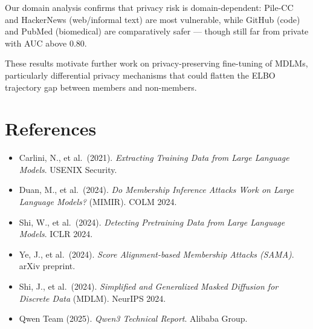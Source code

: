 \documentclass[11pt,a4paper]{article}
\begin{document}
Our domain analysis confirms that privacy risk is domain-dependent:
Pile-CC and HackerNews (web/informal text) are most vulnerable, while GitHub
(code) and PubMed (biomedical) are comparatively safer --- though still far
from private with AUC above 0.80.

These results motivate further work on privacy-preserving fine-tuning of MDLMs,
particularly differential privacy mechanisms that could flatten the ELBO trajectory
gap between members and non-members.

\section*{References}

\begin{itemize}[nosep,leftmargin=1.5em]
  \item Carlini, N., et al.\ (2021). \textit{Extracting Training Data from Large Language Models}. USENIX Security.
  \item Duan, M., et al.\ (2024). \textit{Do Membership Inference Attacks Work on Large Language Models?} (MIMIR). COLM 2024.
  \item Shi, W., et al.\ (2024). \textit{Detecting Pretraining Data from Large Language Models}. ICLR 2024.
  \item Ye, J., et al.\ (2024). \textit{Score Alignment-based Membership Attacks (SAMA)}. arXiv preprint.
  \item Shi, J., et al.\ (2024). \textit{Simplified and Generalized Masked Diffusion for Discrete Data} (MDLM). NeurIPS 2024.
  \item Qwen Team (2025). \textit{Qwen3 Technical Report}. Alibaba Group.
\end{itemize}
\end{document}
